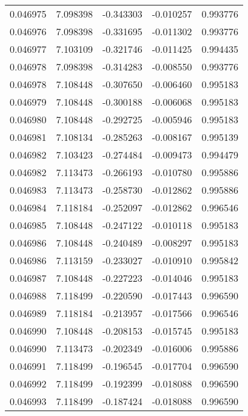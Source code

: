 \begin{tabular}{lrrrr}
0.046975    &  7.098398 & -0.343303 & -0.010257 &             0.993776 \\
0.046976    &  7.098398 & -0.331695 & -0.011302 &             0.993776 \\
0.046977    &  7.103109 & -0.321746 & -0.011425 &             0.994435 \\
0.046978    &  7.098398 & -0.314283 & -0.008550 &             0.993776 \\
0.046978    &  7.108448 & -0.307650 & -0.006460 &             0.995183 \\
0.046979    &  7.108448 & -0.300188 & -0.006068 &             0.995183 \\
0.046980    &  7.108448 & -0.292725 & -0.005946 &             0.995183 \\
0.046981    &  7.108134 & -0.285263 & -0.008167 &             0.995139 \\
0.046982    &  7.103423 & -0.274484 & -0.009473 &             0.994479 \\
0.046982    &  7.113473 & -0.266193 & -0.010780 &             0.995886 \\
0.046983    &  7.113473 & -0.258730 & -0.012862 &             0.995886 \\
0.046984    &  7.118184 & -0.252097 & -0.012862 &             0.996546 \\
0.046985    &  7.108448 & -0.247122 & -0.010118 &             0.995183 \\
0.046986    &  7.108448 & -0.240489 & -0.008297 &             0.995183 \\
0.046986    &  7.113159 & -0.233027 & -0.010910 &             0.995842 \\
0.046987    &  7.108448 & -0.227223 & -0.014046 &             0.995183 \\
0.046988    &  7.118499 & -0.220590 & -0.017443 &             0.996590 \\
0.046989    &  7.118184 & -0.213957 & -0.017566 &             0.996546 \\
0.046990    &  7.108448 & -0.208153 & -0.015745 &             0.995183 \\
0.046990    &  7.113473 & -0.202349 & -0.016006 &             0.995886 \\
0.046991    &  7.118499 & -0.196545 & -0.017704 &             0.996590 \\
0.046992    &  7.118499 & -0.192399 & -0.018088 &             0.996590 \\
0.046993    &  7.118499 & -0.187424 & -0.018088 &             0.996590 \\

\end{tabular}
